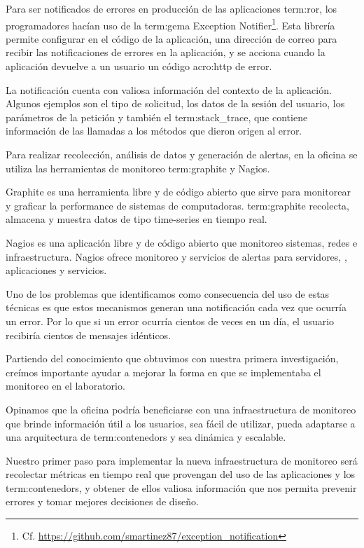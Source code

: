 Para ser notificados de errores en producción de las aplicaciones
\gls{term:ror}, los programadores hacían uso de la \gls{term:gema} Exception
Notifier\footnote{Cf.
\url{https://github.com/smartinez87/exception_notification}}. Esta librería
permite configurar en el código de la aplicación, una dirección de correo para
recibir las notificaciones de errores en la aplicación, y se acciona cuando la
aplicación devuelve a un usuario un código \gls{acro:http} de error.

La notificación cuenta con valiosa información del contexto de la aplicación.
Algunos ejemplos son el tipo de solicitud, los datos de la sesión del usuario,
los parámetros de la petición y también el \gls{term:stack_trace}, que contiene
información de las llamadas a los métodos que dieron origen al error.

Para realizar recolección, análisis de datos y generación de alertas, en la
oficina se utiliza las herramientas de monitoreo \gls{term:graphite} y Nagios.

Graphite es una herramienta libre y de código abierto que sirve para monitorear
y graficar la performance de sistemas de computadoras. \gls{term:graphite} recolecta,
almacena y muestra datos de tipo time-series en tiempo real.

Nagios es una aplicación libre y de código abierto que monitoreo sistemas,
redes e infraestructura. Nagios ofrece monitoreo y servicios de alertas para
servidores, , aplicaciones y servicios.

Uno de los problemas que identificamos como consecuencia del uso de estas
técnicas es que estos mecanismos generan una notificación cada vez que ocurría
un error. Por lo que si un error ocurría cientos de veces en un día, el usuario
recibiría cientos de mensajes idénticos.

Partiendo del conocimiento que obtuvimos con nuestra primera investigación,
creímos importante ayudar a mejorar la forma en que se implementaba el
monitoreo en el laboratorio.

Opinamos que la oficina podría beneficiarse con una infraestructura de
monitoreo que brinde información útil a los usuarios, sea fácil de utilizar,
pueda adaptarse a una arquitectura de \glspl{term:contenedor} y sea dinámica y
escalable.

Nuestro primer paso para implementar la nueva infraestructura de monitoreo será
recolectar métricas en tiempo real que provengan del uso de las aplicaciones y
los \glspl{term:contenedor}, y obtener de ellos valiosa información que nos
permita prevenir errores y tomar mejores decisiones de diseño.

